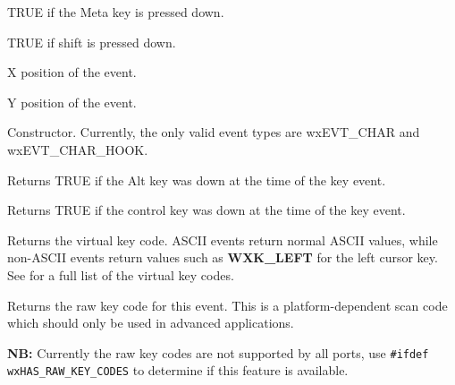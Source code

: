 
TRUE if the Meta key is pressed down.



TRUE if shift is pressed down.



X position of the event.



Y position of the event.



Constructor. Currently, the only valid event types are wxEVT\_CHAR and wxEVT\_CHAR\_HOOK.



Returns TRUE if the Alt key was down at the time of the key event.



Returns TRUE if the control key was down at the time of the key event.



Returns the virtual key code. ASCII events return normal ASCII values,
while non-ASCII events return values such as {\bf WXK\_LEFT} for the
left cursor key. See  for a full list of the virtual key codes.



Returns the raw key code for this event. This is a platform-dependent scan code
which should only be used in advanced applications.

{\bf NB:} Currently the raw key codes are not supported by all ports, use
{\tt\#ifdef wxHAS\_RAW\_KEY\_CODES} to determine if this feature is available.



